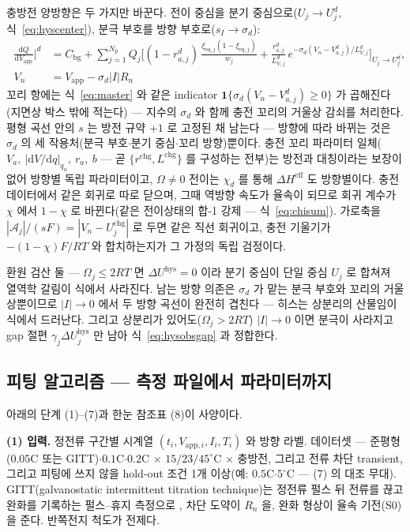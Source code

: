 \documentclass[11pt,a4paper]{article}
\newcommand{\dd}{\mathrm{d}}
\newcommand{\eff}{\mathrm{eff}}
\newcommand{\eq}{\mathrm{eq}}
\newcommand{\app}{\mathrm{app}}
\newcommand{\bg}{\mathrm{bg}}
\newcommand{\chg}{\mathrm{chg}}
\newcommand{\hys}{\mathrm{hys}}
\begin{document}
충방전 양방향은 두 가지만 바꾼다. 전이 중심을 분기 중심으로($U_j\to U_j^{d}$,
식~\eqref{eq:hyscenter}), 분극 부호를 방향 부호로($s_I\to\sigma_d$):
\begin{equation}
\boxed{\;\begin{aligned}\frac{\dd Q}{\dd V_\app}\Big|^{d}&=C_\bg+\sum_{j=1}^{N_p}Q_j\bigg[
(1-r_{a,j}^d)\,\frac{\xi_{\eq,j}(1-\xi_{\eq,j})}{w_j}
+\frac{r_{a,j}^d}{L_{V,j}^d}\,e^{-\sigma_d(V_n-V_{a,j}^d)/L_{V,j}^d}\bigg]_{U_j\to U_j^{d}},\\[2pt]
V_n&=V_\app-\sigma_d|I|R_n\end{aligned}\;}
\label{eq:hysmaster}
\end{equation}
꼬리 항에는 식~\eqref{eq:master} 와 같은 indicator $\mathbf 1\{\sigma_d(V_n-V_{a,j}^d)\ge0\}$
가 곱해진다(지면상 박스 밖에 적는다) — 지수의 $\sigma_d$ 와 함께 충전 꼬리의 거울상 감쇠를 처리한다.
평형 곡선 안의 $s$ 는 방전 규약 $+1$ 로 고정된 채 남는다 — 방향에 따라 바뀌는 것은 $\sigma_d$ 의 세
작용처(분극 부호$\cdot$분기 중심$\cdot$꼬리 방향)뿐이다. 충전 꼬리 파라미터 일체($V_a,\ |\dd V/\dd q|_{q_a},\ r_a,\ b$ — 곧 $\{r^{\chg},L^{\chg}\}$
를 구성하는 전부)는 방전과 대칭이라는 보장이 없어 방향별 독립 파라미터이고, $\Omega\ne0$ 전이는
$\chi_d$ 를 통해 $\Delta H^{\eff}$ 도 방향별이다. 충전 데이터에서 같은 회귀로 따로 닫으며, 그때 역방향 속도가 율속이 되므로 회귀 계수가
$\chi$ 에서 $1-\chi$ 로 바뀐다(같은 전이상태의 합-1 강제 — 식~\eqref{eq:chisum}). 가로축을 $|\mathcal A_j|/(sF)=|V_n-U_j^{\chg}|$ 로 두면 같은 직선 회귀이고,
충전 기울기가 $-(1-\chi)F/RT$ 와 합치하는지가 그 가정의 독립 검정이다.

환원 검산 둘 — $\Omega_j\le2RT$ 면 $\Delta U^\hys=0$ 이라 분기 중심이 단일 중심 $U_j$ 로 합쳐져
열역학 갈림이 식에서 사라진다. 남는 방향 의존은 $\sigma_d$ 가 맡는 분극 부호와 꼬리의 거울상뿐이므로
$|I|\to0$ 에서 두 방향 곡선이 완전히 겹친다 — 히스는 상분리의 산물임이 식에서 드러난다. 그리고 상분리가
있어도($\Omega_j>2RT$) $|I|\to0$ 이면 분극이 사라지고 gap 절편 $\gamma_j\Delta U_j^\hys$ 만 남아
식~\eqref{eq:hysobsgap} 과 정합한다.

\subsection{피팅 알고리즘 — 측정 파일에서 파라미터까지}
아래의 단계 (1)--(7)과 한눈 참조표 (8)이 사양이다.

\textbf{(1) 입력.} 정전류 구간별 시계열 $(t_i,V_{\app,i},I_i,T_i)$ 와 방향 라벨. 데이터셋 — 준평형
($0.05$C 또는 GITT)$\cdot$$0.1$C$\cdot$$0.2$C $\times$ $15/23/45^\circ$C $\times$ 충방전, 그리고 전류
차단 transient, 그리고 피팅에 쓰지 않을 hold-out 조건 1개 이상(예: $0.5$C$\cdot$$5^\circ$C —
(7) 의 대조 무대). GITT(galvanostatic intermittent titration technique)는 정전류 펄스 뒤 전류를 끊고 완화를
기록하는 펄스--휴지 측정으로 \cite{weppner1977}, 차단 도약이 $R_n$ 을, 완화 형상이 율속 기전(S0)을 준다.
반쪽전지 척도가 전제다.
\end{document}
